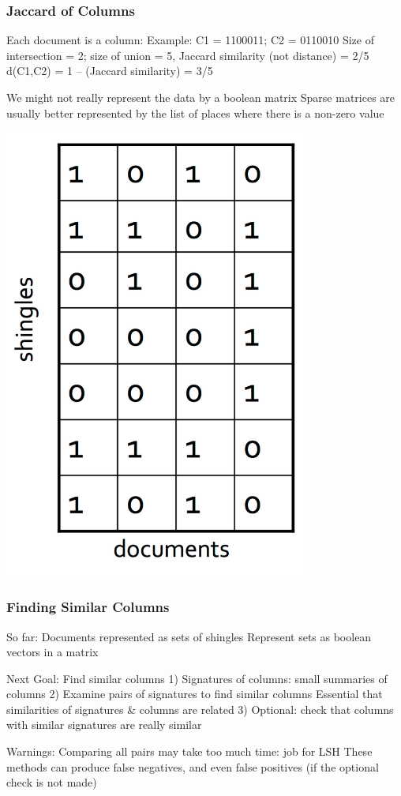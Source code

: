\documentclass[svgnames]{beamer}
\begin{document}
\begin{frame} \frametitle{Jaccard of Columns}

Each document is a column:
  Example: C1 = 1100011; C2 = 0110010
  Size of intersection = 2; size of union = 5, Jaccard similarity (not distance) = 2/5
  d(C1,C2) = 1 – (Jaccard similarity) = 3/5

We might not really represent the data by a boolean matrix
  Sparse matrices are usually better represented by the list of places where there is a non-zero value
  
\includegraphics[width=10cm]{matrix}

\end{frame}

  
\begin{frame} \frametitle{Finding Similar Columns}

So far:
  Documents represented as sets of shingles
  Represent sets as boolean vectors in a matrix

Next Goal: Find similar columns
 1) Signatures of columns: small summaries of columns
 2) Examine pairs of signatures to find similar columns 
       Essential that similarities of signatures & columns are related
 3) Optional: check that columns with similar signatures are really similar

Warnings:
  Comparing all pairs may take too much time: job for LSH
  These methods can produce false negatives, and even false positives (if the optional check is not made)
  
\end{frame}
\end{document}
